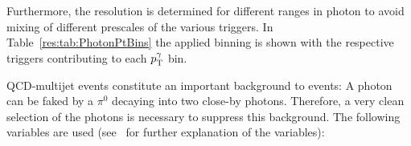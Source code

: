Furthermore, the resolution is determined for different ranges in photon \pt to avoid mixing of different prescales of the various triggers. 
In Table~\ref{res:tab:PhotonPtBins} the applied binning is shown with the respective triggers contributing to each $p_{\text{T}}^{\gamma}$ bin.
\renewcommand{\arraystretch}{1.5}
\begin{table}[htb]
\centering
\caption{Photon \pt bins and corresponding triggers.}
\label{res:tab:PhotonPtBins}
\end{table}

QCD-multijet events constitute an important background to \GAMJET events: A photon can be faked by a $\pi^{0}$ decaying into two close-by photons. 
Therefore, a very clean selection of the photons is necessary to suppress this background.
The following variables are used (see~\cite{CMS-PAS-EGM-10-006} for further explanation of the variables):

